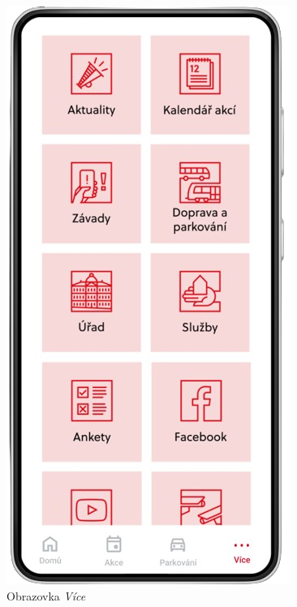 \begin{minipage}[t]{0.45\textwidth}
\begin{figure}[H]
    \includegraphics[width=.7\textwidth]{screen4.png}
    \caption{Obrazovka \textit{Více}}
    \label{fig:mockup4}
  \end{figure}
\end{minipage}
